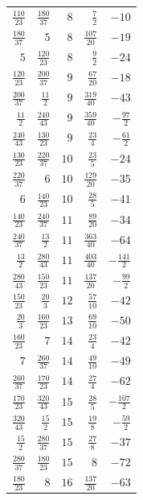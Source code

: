{\begin{longtable}{@{\extracolsep{\fill}}rrrrr}
$\frac{110}{23}$ & $\frac{180}{37}$ & $8$ & $\frac{7}{2}$ & $-10$ \\
$\frac{180}{37}$ & $5$ & $8$ & $\frac{107}{20}$ & $-19$ \\
$5$ & $\frac{120}{23}$ & $8$ & $\frac{9}{2}$ & $-24$ \\
$\frac{120}{23}$ & $\frac{200}{37}$ & $9$ & $\frac{67}{20}$ & $-18$ \\
$\frac{200}{37}$ & $\frac{11}{2}$ & $9$ & $\frac{319}{40}$ & $-43$ \\
$\frac{11}{2}$ & $\frac{240}{43}$ & $9$ & $\frac{359}{40}$ & $-\frac{97}{2}$ \\
$\frac{240}{43}$ & $\frac{130}{23}$ & $9$ & $\frac{23}{4}$ & $-\frac{61}{2}$ \\
$\frac{130}{23}$ & $\frac{220}{37}$ & $10$ & $\frac{23}{5}$ & $-24$ \\
$\frac{220}{37}$ & $6$ & $10$ & $\frac{129}{20}$ & $-35$ \\
$6$ & $\frac{140}{23}$ & $10$ & $\frac{28}{5}$ & $-41$ \\
$\frac{140}{23}$ & $\frac{240}{37}$ & $11$ & $\frac{89}{20}$ & $-34$ \\
$\frac{240}{37}$ & $\frac{13}{2}$ & $11$ & $\frac{363}{40}$ & $-64$ \\
$\frac{13}{2}$ & $\frac{280}{43}$ & $11$ & $\frac{403}{40}$ & $-\frac{141}{2}$ \\
$\frac{280}{43}$ & $\frac{150}{23}$ & $11$ & $\frac{137}{20}$ & $-\frac{99}{2}$ \\
$\frac{150}{23}$ & $\frac{20}{3}$ & $12$ & $\frac{57}{10}$ & $-42$ \\
$\frac{20}{3}$ & $\frac{160}{23}$ & $13$ & $\frac{69}{10}$ & $-50$ \\
$\frac{160}{23}$ & $7$ & $14$ & $\frac{23}{4}$ & $-42$ \\
$7$ & $\frac{260}{37}$ & $14$ & $\frac{49}{10}$ & $-49$ \\
$\frac{260}{37}$ & $\frac{170}{23}$ & $14$ & $\frac{27}{4}$ & $-62$ \\
$\frac{170}{23}$ & $\frac{320}{43}$ & $15$ & $\frac{28}{5}$ & $-\frac{107}{2}$ \\
$\frac{320}{43}$ & $\frac{15}{2}$ & $15$ & $\frac{19}{8}$ & $-\frac{59}{2}$ \\
$\frac{15}{2}$ & $\frac{280}{37}$ & $15$ & $\frac{27}{8}$ & $-37$ \\
$\frac{280}{37}$ & $\frac{180}{23}$ & $15$ & $8$ & $-72$ \\
$\frac{180}{23}$ & $8$ & $16$ & $\frac{137}{20}$ & $-63$ \\

\end{longtable}}
